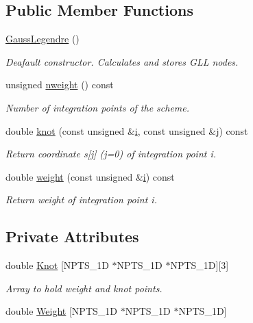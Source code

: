 \subsection*{Public Member Functions}
\begin{DoxyCompactItemize}
\item 
\hyperlink{classoomph_1_1GaussLegendre_3_013_00_01NPTS__1D_01_4_a39d9c8ab477cb99c02964539dff34e18}{Gauss\+Legendre} ()
\begin{DoxyCompactList}\small\item\em Deafault constructor. Calculates and stores G\+LL nodes. \end{DoxyCompactList}\item 
unsigned \hyperlink{classoomph_1_1GaussLegendre_3_013_00_01NPTS__1D_01_4_a526e077429bd9febc58073333e3257c7}{nweight} () const
\begin{DoxyCompactList}\small\item\em Number of integration points of the scheme. \end{DoxyCompactList}\item 
double \hyperlink{classoomph_1_1GaussLegendre_3_013_00_01NPTS__1D_01_4_afd48661debb3035ed10b6656a8a9bcf5}{knot} (const unsigned \&\hyperlink{cfortran_8h_adb50e893b86b3e55e751a42eab3cba82}{i}, const unsigned \&j) const
\begin{DoxyCompactList}\small\item\em Return coordinate s\mbox{[}j\mbox{]} (j=0) of integration point i. \end{DoxyCompactList}\item 
double \hyperlink{classoomph_1_1GaussLegendre_3_013_00_01NPTS__1D_01_4_ab35137bd69a4ae002392ce31c63cd8e6}{weight} (const unsigned \&\hyperlink{cfortran_8h_adb50e893b86b3e55e751a42eab3cba82}{i}) const
\begin{DoxyCompactList}\small\item\em Return weight of integration point i. \end{DoxyCompactList}\end{DoxyCompactItemize}
\subsection*{Private Attributes}
\begin{DoxyCompactItemize}
\item 
double \hyperlink{classoomph_1_1GaussLegendre_3_013_00_01NPTS__1D_01_4_a171c480404bb5c39a099f93a897b55b5}{Knot} \mbox{[}N\+P\+T\+S\+\_\+1D $\ast$N\+P\+T\+S\+\_\+1D $\ast$N\+P\+T\+S\+\_\+1D\mbox{]}\mbox{[}3\mbox{]}
\begin{DoxyCompactList}\small\item\em Array to hold weight and knot points. \end{DoxyCompactList}\item 
double \hyperlink{classoomph_1_1GaussLegendre_3_013_00_01NPTS__1D_01_4_add90f9ee4e93eadc341d80433d7c6a35}{Weight} \mbox{[}N\+P\+T\+S\+\_\+1D $\ast$N\+P\+T\+S\+\_\+1D $\ast$N\+P\+T\+S\+\_\+1D\mbox{]}
\end{DoxyCompactItemize}
